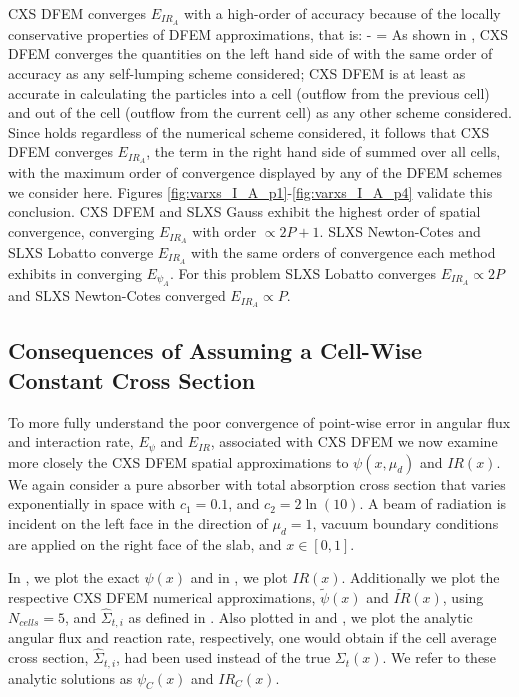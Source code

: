 CXS DFEM converges $E_{IR_A}$ with a high-order of accuracy because of the locally conservative properties of DFEM approximations, that is:
\benum
{} -  =   \pep
\label{eq:chap3_balance}
\eenum
As shown in , CXS DFEM converges the quantities on the left hand side of  with the same order of accuracy as any self-lumping scheme considered; CXS DFEM is at least as accurate in calculating the particles into a cell (outflow from the previous cell) and out of the cell (outflow from the current cell) as any other scheme considered.
Since  holds regardless of the numerical scheme considered, it follows that CXS DFEM converges $E_{IR_A}$, the term in the right hand side of  summed over all cells, with the maximum order of convergence displayed by any of the DFEM schemes we consider here.
Figures \ref{fig:varxs_I_A_p1}-\ref{fig:varxs_I_A_p4} validate this conclusion.
CXS DFEM and SLXS Gauss exhibit the highest order of spatial convergence, converging $E_{IR_A}$ with order $\propto 2P + 1$.  
SLXS Newton-Cotes and SLXS Lobatto converge $E_{IR_A}$ with the same orders of convergence each method exhibits in converging $E_{\psi_A}$.
For this problem SLXS Lobatto converges $E_{IR_A} \propto 2P$ and SLXS Newton-Cotes converged $E_{IR_A} \propto P$.

\subsection{Consequences of Assuming a Cell-Wise Constant Cross Section}

To more fully understand the poor convergence of point-wise error in angular flux and interaction rate, $E_{\psi}$ and $E_{IR}$, associated with CXS DFEM  we now examine more closely the CXS DFEM spatial approximations to $\psi(x,\mu_d)$ and $IR(x)$. 
We again consider a pure absorber with total absorption cross section that varies exponentially in space with $c_1 = 0.1$, and $c_2 = 2\ln(10)$.  
A beam of radiation is incident on the left face in the direction of $\mu_d=1$, vacuum boundary conditions are applied on the right face of the slab, and $x\in[0, 1]$.    

In , we plot the exact $\psi(x)$ and in , we plot $IR(x)$.  
Additionally we plot the respective CXS DFEM numerical approximations, $\widetilde{\psi}(x)$ and $\widetilde{IR}(x)$, using $N_{cells}=5$, and $\hat{\Sigma}_{t,i}$ as defined in . 
Also plotted in  and , we plot the analytic angular flux and reaction rate, respectively, one would obtain if the cell average cross section, $\hat{\Sigma}_{t,i}$, had been used instead of the true $\Sigma_t(x)$.
We refer to these analytic solutions as $\psi_C(x)$ and $IR_C(x)$.

